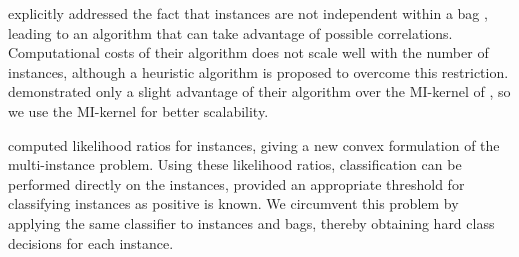 \citet{zhou2009multi} explicitly addressed the fact that instances are not
independent within a bag , leading to an algorithm that can take advantage of
possible correlations. Computational costs of their algorithm does not scale
well with the number of instances, although a heuristic algorithm is proposed
to overcome this restriction. 
\citet{zhou2009multi} demonstrated only a slight
advantage of their algorithm over the MI-kernel of \citet{gaertner2002multi},
so we use the MI-kernel for better scalability.

\citet{liconvex2010} computed likelihood ratios for instances, giving a new
convex formulation of the multi-instance problem. Using these likelihood
ratios, classification can be performed directly on the instances, provided an
appropriate threshold for classifying instances as positive is known. We
circumvent this problem by applying the same classifier to instances and bags,
thereby obtaining hard class decisions for each instance.




